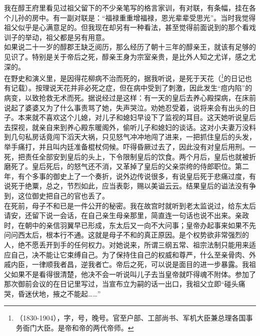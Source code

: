 我在醇王府里看见过祖父留下的不少亲笔写的格言家训，有对联，有条幅，挂在各个儿孙的房中。有一副对联是：“福禄重重增福禄，恩光辈辈受思光”。当时我觉得祖父似乎是心满意足的。但我现在却另有一种看法，甚至觉得前面说到的那个看戏训子的举动，祖父都是另有用意。\\

如果说二十一岁的醇郡王缺乏阅历，那么经历了朝十三年的醇亲王，就该有足够的见识了。特别是关于帝后之死，醇亲王身为宗室亲贵，是比外人知之尤详，感之尤深的。\\

在野史和演义里，是因得花柳病不治而死的，据我听说，是死于天花（\footnote{（1830-1904），字，号，晚号。官至户部、工部尚书、军机大臣兼总理各国事务衙门大臣。是帝和帝的两代帝师。}的日记也有记载）。按理说天花并非必死之症，但在病中受到了刺激，因此发生“痘内陷”的病变，以致抢救无术而死。据说经过是这样：有一天的皇后去养心殿探病，在床前说起了婆婆又为了什么事责骂了她，失声哭泣。劝她忍受着，说将来会有出头的日子。本来就不喜欢这个儿媳，对儿子和媳妇早设下了监视的耳目。这天她听说皇后去探视，就亲自来到养心殿东暖阁外，偷听儿子和媳妇的谈话。这对小夫妻万没料到几句私房话竟闯下滔天大祸，只见怒气冲冲地闯了进来，一把抓住皇后的头发，举手痛打，并且叫内廷准备棍杖伺候。吓得昏厥过去了，因此没有对皇后用刑。一死，把责任全部安到皇后的头上，下令限制皇后的饮食。两个月后，皇后也就被折磨死了。皇后死后，的怒气还不消，又革掉了皇后的父亲崇绔的侍郎职位。第二年，有个多事的御史上了一个奏折，说外边传说很多，有说皇后死于悲痛过度，有说死于绝粟，总之，节烈如此，应当表彰，赐以美谥云云。结果皇后的谥法没有争到，这位御史把自己的官也丢了。\\

在死前，母子不和已是一件公开的秘密。我在故宫时就听到老太监说过，给东太后请安，还留下说一会话，在自己亲生母亲那里，简直连一句话也说不出来。亲政时，在朝中的亲信羽翼早已形成，东太后又一向不大问事；皇帝办起事来如果不先问问西太后，根本行不通。这就是母子不和的真正原因。是个权势欲非常强烈的人，绝不愿丢开到手的任何权力。对她说来，所谓三纲五常、祖宗法制只能用来适应自己，决不能让它束缚自己。为了保持住自己的权威和尊严，什么至亲骨肉、外戚内臣，一律顺我者昌，逆我者亡。帝后之死，可以说是面目的进一步暴露。我祖父如果不是看得很清楚，他决不会一听说叫儿子去当皇帝就吓得魂不附体。参加了那次御前会议的在日记里写过，当宣布立为嗣的话一出口，我祖父立即“碰头痛哭，昏迷伏地，掖之不能起……”\\

